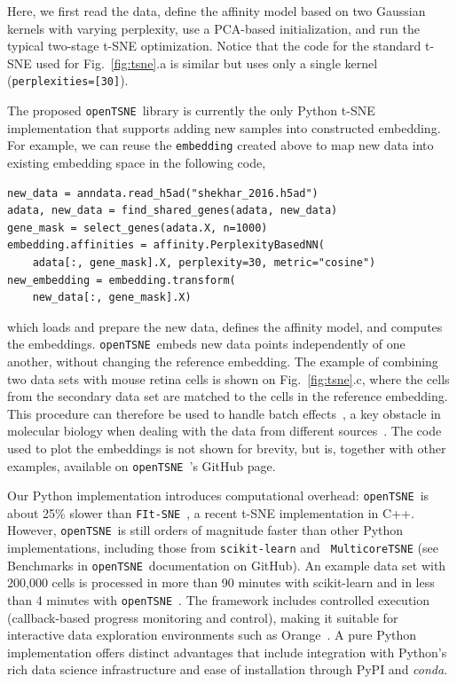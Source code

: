 \documentclass{bioinfo}
\newcommand{\opentsne}[0]{{\tt openTSNE}\ }
\begin{document}
\noindent Here, we first read the data, define the affinity model based on two
Gaussian kernels with varying perplexity, use a PCA-based initialization, and run
the typical two-stage t-SNE optimization. Notice that the code for the standard
t-SNE used for Fig.~\ref{fig:tsne}.a is similar but uses only a single kernel
({\tt perplexities=[30]}).

The proposed \opentsne library is currently the only Python t\nobreakdash -SNE
implementation that supports adding new samples into constructed embedding. For
example, we can reuse the {\tt embedding} created above to map new data into
existing embedding space in the following code,

\begin{lstlisting}
new_data = anndata.read_h5ad("shekhar_2016.h5ad")
adata, new_data = find_shared_genes(adata, new_data)
gene_mask = select_genes(adata.X, n=1000)
embedding.affinities = affinity.PerplexityBasedNN(
	adata[:, gene_mask].X, perplexity=30, metric="cosine")
new_embedding = embedding.transform(
	new_data[:, gene_mask].X)
\end{lstlisting}

\noindent which loads and prepare the new data, defines the affinity model, and
computes the embeddings. \opentsne embeds new data points independently of one 
another, without changing the reference embedding. The example of combining two
data sets with mouse retina cells is shown on Fig.~\ref{fig:tsne}.c, where the
cells from the secondary data set are matched to the cells in the reference
embedding. This
procedure can therefore be used to handle batch effects~\citep{polivcar2019embedding}, a key
obstacle in molecular biology when dealing with the data from different
sources~\citep{batch_effect_causes}. The code used to plot the embeddings is not shown
for brevity, but is, together with other examples, available on {\opentsne}'s
GitHub page. 

Our Python implementation introduces computational overhead: \opentsne is about
25\% slower than {\tt FIt-SNE}~\citep{fi_tsne}, a recent t-SNE implementation
in C++. However, \opentsne is still orders of magnitude faster than other
Python implementations, including those from {\tt scikit-learn} and {\tt
MulticoreTSNE} (see Benchmarks in \opentsne documentation on GitHub). An example data set with 200,000 cells
is processed in more than 90 minutes with scikit-learn and in less than 4 minutes with \opentsne.
The framework includes controlled execution (callback-based progress monitoring and
control), making it suitable for interactive data exploration environments such
as Orange~\citep{scorange}. A pure Python implementation offers distinct
advantages that include integration with Python's rich data science
infrastructure and ease of installation through PyPI and {\em conda}.
\end{document}
